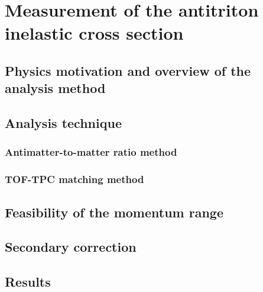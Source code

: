 \section{Measurement of the antitriton inelastic cross section}\label{sec:ResTritonSigmaInel}
\subsection{Physics motivation and overview of the analysis method}
\subsection{Analysis technique}
\subsubsection{Antimatter-to-matter ratio method}
\subsubsection{TOF-TPC matching method}
\subsection{Feasibility of the momentum range}
\subsection{Secondary correction}
\subsection{Results}

